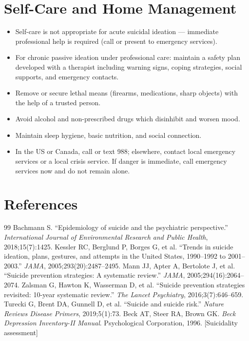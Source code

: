 \section*{Self-Care and Home Management}
\begin{itemize}
  \item Self-care is not appropriate for acute suicidal ideation --- immediate professional help is required (call or present to emergency services).
  \item For chronic passive ideation under professional care: maintain a safety plan developed with a therapist including warning signs, coping strategies, social supports, and emergency contacts.
  \item Remove or secure lethal means (firearms, medications, sharp objects) with the help of a trusted person.
  \item Avoid alcohol and non-prescribed drugs which disinhibit and worsen mood.
  \item Maintain sleep hygiene, basic nutrition, and social connection.
  \item In the US or Canada, call or text 988; elsewhere, contact local emergency services or a local crisis service. If danger is immediate, call emergency services now and do not remain alone.
\end{itemize}

\section*{References}
\begin{thebibliography}{99}
 Bachmann S. ``Epidemiology of suicide and the psychiatric perspective.'' \textit{International Journal of Environmental Research and Public Health}, 2018;15(7):1425.
 Kessler RC, Berglund P, Borges G, et al. ``Trends in suicide ideation, plans, gestures, and attempts in the United States, 1990--1992 to 2001--2003.'' \textit{JAMA}, 2005;293(20):2487--2495.
 Mann JJ, Apter A, Bertolote J, et al. ``Suicide prevention strategies: A systematic review.'' \textit{JAMA}, 2005;294(16):2064--2074.
 Zalsman G, Hawton K, Wasserman D, et al. ``Suicide prevention strategies revisited: 10-year systematic review.'' \textit{The Lancet Psychiatry}, 2016;3(7):646--659.
 Turecki G, Brent DA, Gunnell D, et al. ``Suicide and suicide risk.'' \textit{Nature Reviews Disease Primers}, 2019;5(1):73.
 Beck AT, Steer RA, Brown GK. \textit{Beck Depression Inventory-II Manual}. Psychological Corporation, 1996. [Suicidality assessment]
\end{thebibliography}
